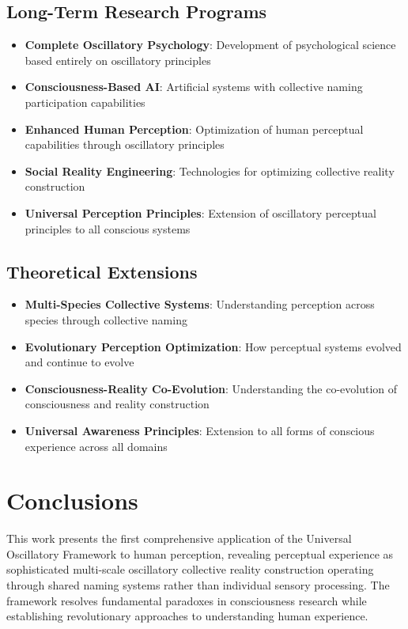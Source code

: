 \documentclass[12pt,a4paper]{article}
\begin{document}
\subsection{Long-Term Research Programs}

\begin{itemize}
\item \textbf{Complete Oscillatory Psychology}: Development of psychological science based entirely on oscillatory principles
\item \textbf{Consciousness-Based AI}: Artificial systems with collective naming participation capabilities
\item \textbf{Enhanced Human Perception}: Optimization of human perceptual capabilities through oscillatory principles
\item \textbf{Social Reality Engineering}: Technologies for optimizing collective reality construction
\item \textbf{Universal Perception Principles}: Extension of oscillatory perceptual principles to all conscious systems
\end{itemize}

\subsection{Theoretical Extensions}

\begin{itemize}
\item \textbf{Multi-Species Collective Systems}: Understanding perception across species through collective naming
\item \textbf{Evolutionary Perception Optimization}: How perceptual systems evolved and continue to evolve
\item \textbf{Consciousness-Reality Co-Evolution}: Understanding the co-evolution of consciousness and reality construction
\item \textbf{Universal Awareness Principles}: Extension to all forms of conscious experience across all domains
\end{itemize}

\section{Conclusions}

This work presents the first comprehensive application of the Universal Oscillatory Framework to human perception, revealing perceptual experience as sophisticated multi-scale oscillatory collective reality construction operating through shared naming systems rather than individual sensory processing. The framework resolves fundamental paradoxes in consciousness research while establishing revolutionary approaches to understanding human experience.
\end{document}
